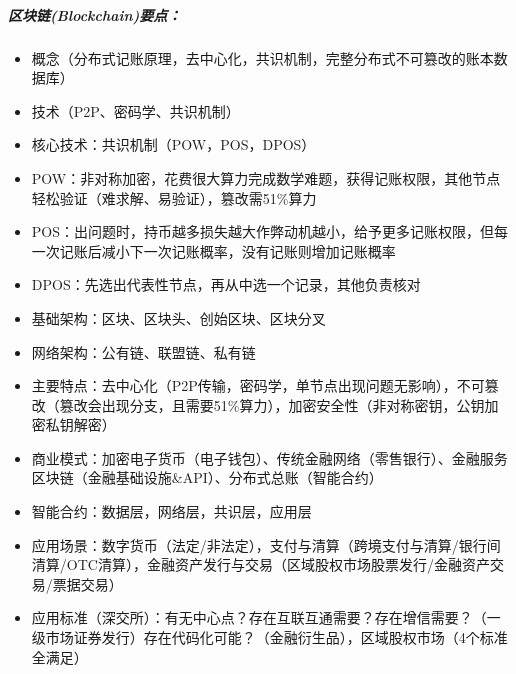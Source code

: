 \documentclass[letterpaper,10pt,english]{sphinxmanual}
\begin{document}
\subparagraph{区块链(Blockchain)要点：}
\label{\detokenize{chapter_AI+Finance/FinTech:blockchain}}\begin{itemize}
\item {} 
概念（分布式记账原理，去中心化，共识机制，完整分布式不可篡改的账本数据库）

\item {} 
技术（P2P、密码学、共识机制）

\item {} 
核心技术：共识机制（POW，POS，DPOS）

\item {} 
POW：非对称加密，花费很大算力完成数学难题，获得记账权限，其他节点轻松验证（难求解、易验证），篡改需51\%算力

\item {} 
POS：出问题时，持币越多损失越大作弊动机越小，给予更多记账权限，但每一次记账后减小下一次记账概率，没有记账则增加记账概率

\item {} 
DPOS：先选出代表性节点，再从中选一个记录，其他负责核对

\item {} 
基础架构：区块、区块头、创始区块、区块分叉

\item {} 
网络架构：公有链、联盟链、私有链

\item {} 
主要特点：去中心化（P2P传输，密码学，单节点出现问题无影响），不可篡改（篡改会出现分支，且需要51\%算力），加密安全性（非对称密钥，公钥加密私钥解密）

\item {} 
商业模式：加密电子货币（电子钱包）、传统金融网络（零售银行）、金融服务区块链（金融基础设施\&API）、分布式总账（智能合约）

\item {} 
智能合约：数据层，网络层，共识层，应用层

\item {} 
应用场景：数字货币（法定/非法定），支付与清算（跨境支付与清算/银行间清算/OTC清算），金融资产发行与交易（区域股权市场股票发行/金融资产交易/票据交易）

\item {} 
应用标准（深交所）：有无中心点？存在互联互通需要？存在增信需要？（一级市场证券发行）存在代码化可能？（金融衍生品），区域股权市场（4个标准全满足）%
\begin{footnote}[1097]\sphinxAtStartFootnote
{}
%
\end{footnote}

\end{itemize}
\end{document}

